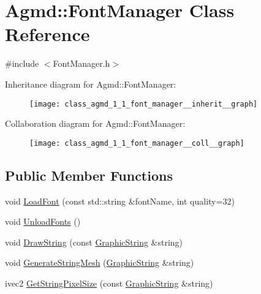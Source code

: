 \hypertarget{class_agmd_1_1_font_manager}{\section{Agmd\+:\+:Font\+Manager Class Reference}
\label{class_agmd_1_1_font_manager}
}


{\ttfamily \#include $<$Font\+Manager.\+h$>$}



Inheritance diagram for Agmd\+:\+:Font\+Manager\+:\nopagebreak
\begin{figure}[H]
\begin{center}
\leavevmode
\texttt{[image: class\_agmd\_1\_1\_font\_manager\_\_inherit\_\_graph]}
\end{center}
\end{figure}


Collaboration diagram for Agmd\+:\+:Font\+Manager\+:\nopagebreak
\begin{figure}[H]
\begin{center}
\leavevmode
\texttt{[image: class\_agmd\_1\_1\_font\_manager\_\_coll\_\_graph]}
\end{center}
\end{figure}
\subsection*{Public Member Functions}
\begin{DoxyCompactItemize}
\item 
void \hyperlink{class_agmd_1_1_font_manager_afa2ec2af9580873775a6d10070c3fa0d}{Load\+Font} (const std\+::string \&font\+Name, int quality=32)
\item 
void \hyperlink{class_agmd_1_1_font_manager_a09ead7e7b82e41bd8df44f4f0560079f}{Unload\+Fonts} ()
\item 
void \hyperlink{class_agmd_1_1_font_manager_a1c98d7c6bcc040ecfc157921e051272d}{Draw\+String} (const \hyperlink{class_agmd_1_1_graphic_string}{Graphic\+String} \&string)
\item 
void \hyperlink{class_agmd_1_1_font_manager_a61c834b443445b2677bfdaee356e1d85}{Generate\+String\+Mesh} (\hyperlink{class_agmd_1_1_graphic_string}{Graphic\+String} \&string)
\item 
ivec2 \hyperlink{class_agmd_1_1_font_manager_a57d9028784b60b4ab1e993ad9363ebc2}{Get\+String\+Pixel\+Size} (const \hyperlink{class_agmd_1_1_graphic_string}{Graphic\+String} \&string)
\end{DoxyCompactItemize}
